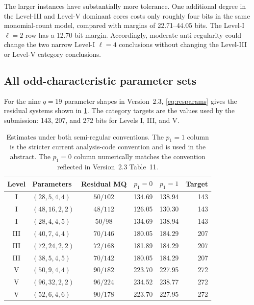 \documentclass[runningheads]{llncs}
\begin{document}
The larger instances have substantially more tolerance.  One additional degree
in the Level-III and Level-V dominant cores costs only roughly four bits in the
same monomial-count model, compared with margins of 22.71--44.05 bits.  The
Level-I $\ell=2$ row has a 12.70-bit margin.  Accordingly, moderate
anti-regularity could change the two narrow Level-I $\ell=4$ conclusions without
changing the Level-III or Level-V category conclusions.

\subsection{All odd-characteristic parameter sets}

For the nine $q=19$ parameter shapes in Version~2.3, \cref{eq:resparams} gives the residual systems shown in \cref{tab:both}.  The category targets are the values used by the submission: 143, 207, and 272 bits for Levels I, III, and V.

\begin{table}[t]
\centering
\caption{Estimates under both semi-regular conventions.  The $p_1=1$ column is the stricter current analysis-code convention and is used in the abstract.  The $p_1=0$ column numerically matches the convention reflected in Version~2.3 Table~11.}\label{tab:both}
\small
\setlength{\tabcolsep}{4pt}
\begin{tabular}{@{}c l c r r r@{}}
\toprule
Level & Parameters & Residual MQ & $p_1=0$ & $p_1=1$ & Target\\
\midrule
I   & $(28,5,4,4)$  & $50/102$ & 134.69 & 138.94 & 143\\
I   & $(48,16,2,2)$ & $48/112$ & 126.05 & 130.30 & 143\\
I   & $(28,4,4,5)$  & $50/98$  & 134.69 & 138.94 & 143\\
III & $(40,7,4,4)$  & $70/146$ & 180.05 & 184.29 & 207\\
III & $(72,24,2,2)$ & $72/168$ & 181.89 & 184.29 & 207\\
III & $(38,5,4,5)$  & $70/142$ & 180.05 & 184.29 & 207\\
V   & $(50,9,4,4)$  & $90/182$ & 223.70 & 227.95 & 272\\
V   & $(96,32,2,2)$ & $96/224$ & 234.52 & 238.77 & 272\\
V   & $(52,6,4,6)$  & $90/178$ & 223.70 & 227.95 & 272\\
\bottomrule
\end{tabular}
\end{table}
\end{document}
